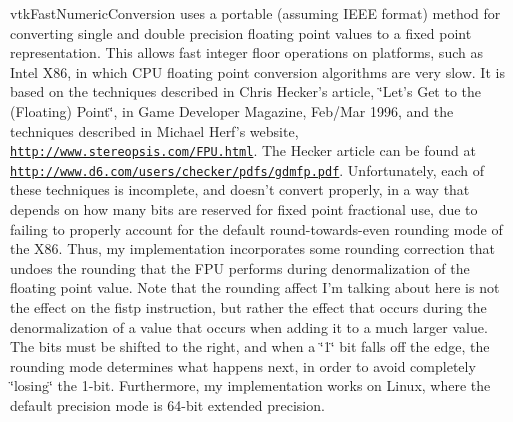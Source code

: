 vtk\-Fast\-Numeric\-Conversion uses a portable (assuming I\-E\-E\-E format) method for converting single and double precision floating point values to a fixed point representation. This allows fast integer floor operations on platforms, such as Intel X86, in which C\-P\-U floating point conversion algorithms are very slow. It is based on the techniques described in Chris Hecker's article, \char`\"{}\-Let's Get to the (\-Floating) Point\char`\"{}, in Game Developer Magazine, Feb/\-Mar 1996, and the techniques described in Michael Herf's website, \href{http://www.stereopsis.com/FPU.html}{\tt http\-://www.\-stereopsis.\-com/\-F\-P\-U.\-html}. The Hecker article can be found at \href{http://www.d6.com/users/checker/pdfs/gdmfp.pdf}{\tt http\-://www.\-d6.\-com/users/checker/pdfs/gdmfp.\-pdf}. Unfortunately, each of these techniques is incomplete, and doesn't convert properly, in a way that depends on how many bits are reserved for fixed point fractional use, due to failing to properly account for the default round-\/towards-\/even rounding mode of the X86. Thus, my implementation incorporates some rounding correction that undoes the rounding that the F\-P\-U performs during denormalization of the floating point value. Note that the rounding affect I'm talking about here is not the effect on the fistp instruction, but rather the effect that occurs during the denormalization of a value that occurs when adding it to a much larger value. The bits must be shifted to the right, and when a \char`\"{}1\char`\"{} bit falls off the edge, the rounding mode determines what happens next, in order to avoid completely \char`\"{}losing\char`\"{} the 1-\/bit. Furthermore, my implementation works on Linux, where the default precision mode is 64-\/bit extended precision.

